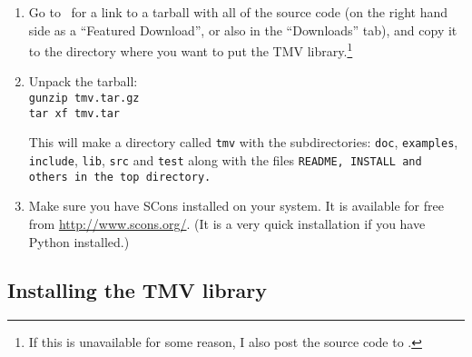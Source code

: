 \begin{enumerate}

\item
Go to \website\ for a link to a tarball with all of the source code (on the right hand side as a
``Featured Download'', or also in the ``Downloads'' tab), and copy
it to the directory where you want to put the TMV library.\footnote{
If this is unavailable for some reason, I also post the source code to \altwebsite.}

\item
Unpack the tarball:\\
\texttt{gunzip tmv\tmvversion .tar.gz}\\
\texttt{tar xf tmv\tmvversion .tar}

This will make a directory called \texttt{tmv\tmvversion} with the subdirectories:
\texttt{doc}, \texttt{examples}, \texttt{include}, \texttt{lib}, \texttt{src} and \texttt{test} 
along with the files \tt{README}, \tt{INSTALL} and others
in the top directory.

\item Make sure you have SCons installed on your system.  
It is available for free from \url{http://www.scons.org/}.  (It is a
very quick installation if you have Python installed.)

\end{enumerate}

\subsection{Installing the TMV library}
\label{Install_Install}

